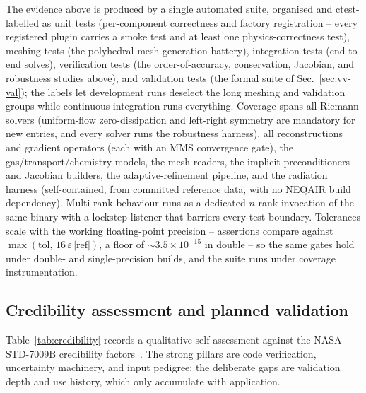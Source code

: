 \documentclass[journal,biblatex]{new-aiaa}
\begin{document}
The evidence above is produced by a single automated suite, organised and ctest-labelled as unit tests (per-component correctness and factory registration -- every registered plugin carries a smoke test and at least one physics-correctness test), meshing tests (the polyhedral mesh-generation battery), integration tests (end-to-end solves), verification tests (the order-of-accuracy, conservation, Jacobian, and robustness studies above), and validation tests (the formal suite of Sec.~\ref{sec:vv-val}); the labels let development runs deselect the long meshing and validation groups while continuous integration runs everything. Coverage spans all Riemann solvers (uniform-flow zero-dissipation and left-right symmetry are mandatory for new entries, and every solver runs the robustness harness), all reconstructions and gradient operators (each with an MMS convergence gate), the gas/transport/chemistry models, the mesh readers, the implicit preconditioners and Jacobian builders, the adaptive-refinement pipeline, and the radiation harness (self-contained, from committed reference data, with no NEQAIR build dependency). Multi-rank behaviour runs as a dedicated $n$-rank invocation of the same binary with a lockstep listener that barriers every test boundary. Tolerances scale with the working floating-point precision -- assertions compare against $\max(\mathrm{tol},\,16\,\varepsilon\,|\mathrm{ref}|)$, a floor of $\sim3.5\times10^{-15}$ in double -- so the same gates hold under double- and single-precision builds, and the suite runs under coverage instrumentation.

\subsection{Credibility assessment and planned validation}
\label{sec:credibility}

Table~\ref{tab:credibility} records a qualitative self-assessment against the NASA-STD-7009B credibility factors~\cite{noauthor_nasa_nodate}. The strong pillars are code verification, uncertainty machinery, and input pedigree; the deliberate gaps are validation depth and use history, which only accumulate with application.
\end{document}
